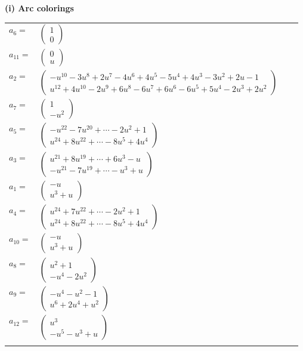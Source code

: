 \documentclass[1p]{elsarticle_modified}
\theoremstyle{definition}
\begin{document}
\flushleft \textbf{(i) Arc colorings}\\
\begin{tabular}{m{7pt} m{180pt} m{7pt} m{180pt} }
\flushright $a_{6}=$&$\begin{pmatrix}1\\0\end{pmatrix}$ \\
\flushright $a_{11}=$&$\begin{pmatrix}0\\u\end{pmatrix}$ \\
\flushright $a_{2}=$&$\begin{pmatrix}- u^{10}-3 u^8+2 u^7-4 u^6+4 u^5-5 u^4+4 u^3-3 u^2+2 u-1\\u^{12}+4 u^{10}-2 u^9+6 u^8-6 u^7+6 u^6-6 u^5+5 u^4-2 u^3+2 u^2\end{pmatrix}$ \\
\flushright $a_{7}=$&$\begin{pmatrix}1\\- u^2\end{pmatrix}$ \\
\flushright $a_{5}=$&$\begin{pmatrix}- u^{22}-7 u^{20}+\cdots-2 u^2+1\\u^{24}+8 u^{22}+\cdots-8 u^5+4 u^4\end{pmatrix}$ \\
\flushright $a_{3}=$&$\begin{pmatrix}u^{21}+8 u^{19}+\cdots+6 u^3- u\\- u^{21}-7 u^{19}+\cdots- u^3+u\end{pmatrix}$ \\
\flushright $a_{1}=$&$\begin{pmatrix}- u\\u^3+u\end{pmatrix}$ \\
\flushright $a_{4}=$&$\begin{pmatrix}u^{24}+7 u^{22}+\cdots-2 u^2+1\\u^{24}+8 u^{22}+\cdots-8 u^5+4 u^4\end{pmatrix}$ \\
\flushright $a_{10}=$&$\begin{pmatrix}- u\\u^3+u\end{pmatrix}$ \\
\flushright $a_{8}=$&$\begin{pmatrix}u^2+1\\- u^4-2 u^2\end{pmatrix}$ \\
\flushright $a_{9}=$&$\begin{pmatrix}- u^4- u^2-1\\u^6+2 u^4+u^2\end{pmatrix}$ \\
\flushright $a_{12}=$&$\begin{pmatrix}u^3\\- u^5- u^3+u\end{pmatrix}$\\&\end{tabular}
\end{document}
